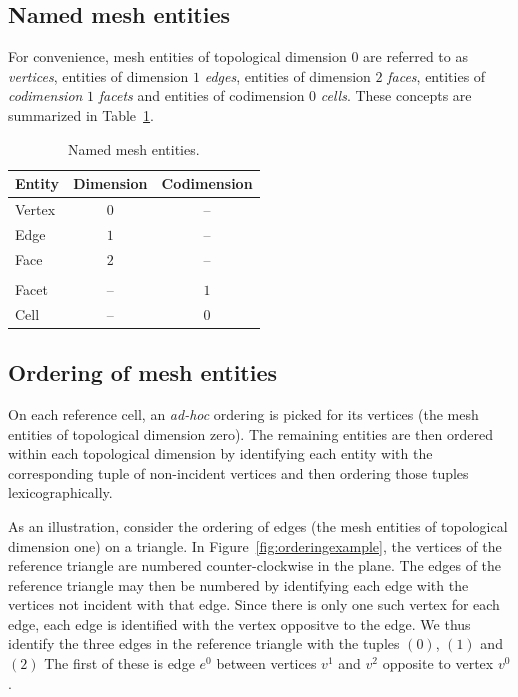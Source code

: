 \subsection{Named mesh entities}

For convenience, mesh entities of topological dimension $0$ are
referred to as \emph{vertices}, entities of dimension $1$
\emph{edges}, entities of dimension $2$ \emph{faces}, entities of
\emph{codimension} $1$ \emph{facets} and entities of codimension $0$
\emph{cells}. These concepts are summarized in
Table~\ref{tab:entities}.

\begin{table}[H]
  \begin{center}
    \begin{tabular}{|l|c|c|}
      \hline
      Entity & Dimension & Codimension \\
      \hline
      Vertex & $0$       & -- \\
      Edge   & $1$       & -- \\
      Face   & $2$       & -- \\
      & & \\
      Facet  & --      &  $1$ \\
      Cell   & --      &  $0$ \\
      \hline
    \end{tabular}
    \caption{Named mesh entities.}
    \label{tab:entities}
  \end{center}
\end{table}

\subsection{Ordering of mesh entities}

On each reference cell, an \emph{ad-hoc} ordering is picked for its
vertices (the mesh entities of topological dimension zero). The
remaining entities are then ordered within each topological dimension
by identifying each entity with the corresponding tuple of
non-incident vertices and then ordering those tuples
lexicographically.

As an illustration, consider the ordering of edges (the mesh entities
of topological dimension one) on a triangle. In
Figure~\ref{fig:orderingexample}, the vertices of the reference
triangle are numbered counter-clockwise in the plane. The edges of the
reference triangle may then be numbered by identifying each edge with
the vertices not incident with that edge. Since there is only one such
vertex for each edge, each edge is identified with the vertex
oppositve to the edge. We thus identify the three edges in the
reference triangle with the tuples $(0)$, $(1)$ and $(2)$
The first of these is edge $e^0$ between vertices $v^1$ and $v^2$
opposite to vertex $v^0$.

